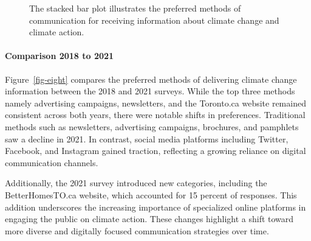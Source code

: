 \documentclass[
  letterpaper,
  DIV=11,
  numbers=noendperiod]{scrartcl}
\let\oldparagraph\paragraph
\renewcommand{\paragraph}[1]{\oldparagraph{#1}\mbox{}}
\begin{document}
\begin{figure}


\caption{\label{fig-seven}The stacked bar plot illustrates the preferred
methods of communication for receiving information about climate change
and climate action.}

\end{figure}%

\paragraph{Comparison 2018 to 2021}\label{comparison-2018-to-2021-3}

Figure~\ref{fig-eight} compares the preferred methods of delivering
climate change information between the 2018 and 2021 surveys. While the
top three methods namely advertising campaigns, newsletters, and the
Toronto.ca website remained consistent across both years, there were
notable shifts in preferences. Traditional methods such as newsletters,
advertising campaigns, brochures, and pamphlets saw a decline in 2021.
In contrast, social media platforms including Twitter, Facebook, and
Instagram gained traction, reflecting a growing reliance on digital
communication channels.

Additionally, the 2021 survey introduced new categories, including the
BetterHomesTO.ca website, which accounted for 15 percent of responses.
This addition underscores the increasing importance of specialized
online platforms in engaging the public on climate action. These changes
highlight a shift toward more diverse and digitally focused
communication strategies over time.
\end{document}
